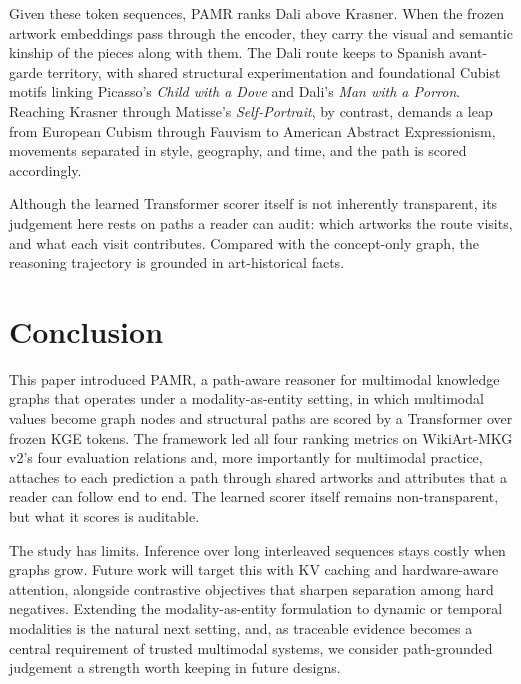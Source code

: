 \documentclass[runningheads]{llncs}
\begin{document}
Given these token sequences, PAMR ranks Dali above Krasner. When the frozen artwork embeddings pass through the encoder, they carry the visual and semantic kinship of the pieces along with them. The Dali route keeps to Spanish avant-garde territory, with shared structural experimentation and foundational Cubist motifs linking Picasso's \textit{Child with a Dove} and Dali's \textit{Man with a Porron}. Reaching Krasner through Matisse's \textit{Self-Portrait}, by contrast, demands a leap from European Cubism through Fauvism to American Abstract Expressionism, movements separated in style, geography, and time, and the path is scored accordingly.

Although the learned Transformer scorer itself is not inherently transparent, its judgement here rests on paths a reader can audit: which artworks the route visits, and what each visit contributes. Compared with the concept-only graph, the reasoning trajectory is grounded in art-historical facts.

\section{Conclusion}
\label{sec:conclusion}

This paper introduced PAMR, a path-aware reasoner for multimodal knowledge graphs that operates under a modality-as-entity setting, in which multimodal values become graph nodes and structural paths are scored by a Transformer over frozen KGE tokens. The framework led all four ranking metrics on WikiArt-MKG v2's four evaluation relations and, more importantly for multimodal practice, attaches to each prediction a path through shared artworks and attributes that a reader can follow end to end. The learned scorer itself remains non-transparent, but what it scores is auditable.

The study has limits. Inference over long interleaved sequences stays
costly when graphs grow. Future work will target this with KV caching
and hardware-aware attention, alongside contrastive objectives that
sharpen separation among hard negatives. Extending the modality-as-entity
formulation to dynamic or temporal modalities is the natural next
setting, and, as traceable evidence becomes a central requirement of
trusted multimodal systems, we consider path-grounded judgement a
strength worth keeping in future designs.
\end{document}
